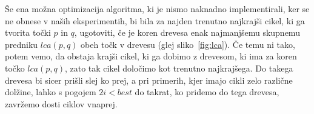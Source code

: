 \documentclass[a4paper, 12pt]{book}
\begin{document}
Še ena možna optimizacija algoritma, ki je nismo naknadno implementirali, ker se ne obnese v naših eksperimentih, bi bila za najden trenutno najkrajši cikel, ki ga tvorita točki $p$ in $q$, ugotoviti, če je koren drevesa enak najmanjšemu skupnemu predniku $lca(p,q)$ obeh točk v drevesu (glej sliko~\ref{fig:lca}). Če temu ni tako, potem vemo, da obstaja krajši cikel, ki ga dobimo z drevesom, ki ima za koren točko $lca(p,q)$, zato tak cikel določimo kot trenutno najkrajšega. Do takega drevesa bi sicer prišli slej ko prej, a pri primerih, kjer imajo cikli zelo različne dolžine, lahko s pogojem $2i < best$ do takrat, ko pridemo do tega drevesa, zavržemo dosti ciklov vnaprej.



\end{document}
